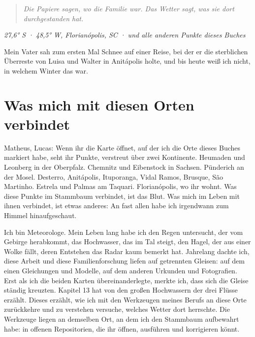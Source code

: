 \documentclass[
  ngerman,
  11pt,
  openany]{book}
\begin{document}
\begin{quote}
\emph{Die Papiere sagen, wo die Familie war. Das Wetter sagt, was sie
dort durchgestanden hat.}
\end{quote}

\emph{27,6° S · 48,5° W, Florianópolis, SC · und alle anderen Punkte
dieses Buches}

Mein Vater sah zum ersten Mal Schnee auf einer Reise, bei der er die
sterblichen Überreste von Luisa und Walter in Anitápolis holte, und bis
heute weiß ich nicht, in welchem Winter das war.

\section{Was mich mit diesen Orten
verbindet}\label{was-mich-mit-diesen-orten-verbindet}

Matheus, Lucas: Wenn ihr die Karte öffnet, auf der ich die Orte dieses
Buches markiert habe, seht ihr Punkte, verstreut über zwei Kontinente.
Heumaden und Leonberg in der Oberpfalz. Chemnitz und Eibenstock in
Sachsen. Pünderich an der Mosel. Desterro, Anitápolis, Ituporanga, Vidal
Ramos, Brusque, São Martinho. Estrela und Palmas am Taquari.
Florianópolis, wo ihr wohnt. Was diese Punkte im Stammbaum verbindet,
ist das Blut. Was mich im Leben mit ihnen verbindet, ist etwas anderes:
An fast allen habe ich irgendwann zum Himmel hinaufgeschaut.

Ich bin Meteorologe. Mein Leben lang habe ich den Regen untersucht, der
vom Gebirge herabkommt, das Hochwasser, das im Tal steigt, den Hagel,
der aus einer Wolke fällt, deren Entstehen das Radar kaum bemerkt hat.
Jahrelang dachte ich, diese Arbeit und diese Familienforschung liefen
auf getrennten Gleisen: auf dem einen Gleichungen und Modelle, auf dem
anderen Urkunden und Fotografien. Erst als ich die beiden Karten
übereinanderlegte, merkte ich, dass sich die Gleise ständig kreuzten.
Kapitel 13 hat von den großen Hochwassern der drei Flüsse erzählt.
Dieses erzählt, wie ich mit den Werkzeugen meines Berufs an diese Orte
zurückkehre und zu verstehen versuche, welches Wetter dort herrschte.
Die Werkzeuge liegen an demselben Ort, an dem ich den Stammbaum
aufbewahrt habe: in offenen Repositorien, die ihr öffnen, ausführen und
korrigieren könnt.
\end{document}
